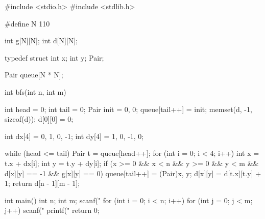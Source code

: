 \begin{mycpptwocol}
    #include <stdio.h>
    #include <stdlib.h>

    #define N 110

    int g[N][N];
    int d[N][N];

    typedef struct {
        int x;
        int y;
    } Pair;

    Pair queue[N * N];

    int bfs(int n, int m)
        {
        int head = 0;
        int tail = 0;
        Pair init = {0, 0};
        queue[tail++] = init;
        memset(d, -1, sizeof(d));
        d[0][0] = 0;

        int dx[4] = {0, 1, 0, -1};
        int dy[4] = {1, 0, -1, 0};

        while (head <= tail) {
            Pair t = queue[head++];
            for (int i = 0; i < 4; i++) {
                int x = t.x + dx[i];
                int y = t.y + dy[i];
                if (x >= 0 && x < n && y >= 0 && y < m && d[x][y] == -1 && g[x][y] == 0) {
                    queue[tail++] = (Pair){x, y};
                    d[x][y] = d[t.x][t.y] + 1;
                }
            }
        }
        return d[n - 1][m - 1];
    }

    int main()
        {
        int n;
        int m;
        scanf("%
        for (int i = 0; i < n; i++) {
            for (int j = 0; j < m; j++) {
                scanf("%
            }
        }
        printf("%
        return 0;
    }
\end{mycpptwocol}

